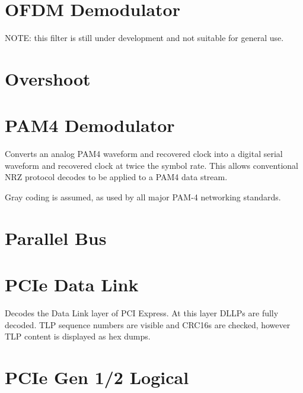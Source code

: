 \section{OFDM Demodulator}

NOTE: this filter is still under development and not suitable for general use.

\pagebreak
\section{Overshoot}

\pagebreak
\section{PAM4 Demodulator}

Converts an analog PAM4 waveform and recovered clock into a digital serial waveform and recovered clock at twice the
symbol rate. This allows conventional NRZ protocol decodes to be applied to a PAM4 data stream.

Gray coding is assumed, as used by all major PAM-4 networking standards.

\pagebreak
\section{Parallel Bus}

\pagebreak
\section{PCIe Data Link}

Decodes the Data Link layer of PCI Express. At this layer DLLPs are fully decoded. TLP sequence numbers are visible
and CRC16s are checked, however TLP content is displayed as hex dumps.

\pagebreak
\section{PCIe Gen 1/2 Logical}

